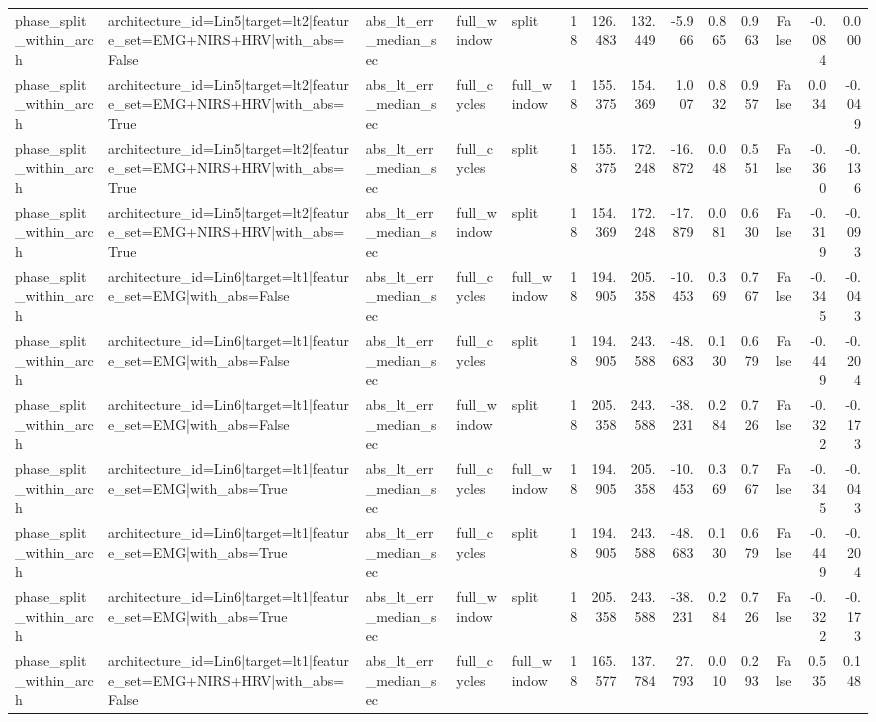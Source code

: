 \begin{table}
\begin{tabular}{lllllrrrrrrrrr}
phase_split_within_arch & architecture_id=Lin5|target=lt2|feature_set=EMG+NIRS+HRV|with_abs=False & abs_lt_err_median_sec & full_window & split & 18 & 126.483 & 132.449 & -5.966 & 0.865 & 0.963 & False & -0.084 & 0.000 \\
phase_split_within_arch & architecture_id=Lin5|target=lt2|feature_set=EMG+NIRS+HRV|with_abs=True & abs_lt_err_median_sec & full_cycles & full_window & 18 & 155.375 & 154.369 & 1.007 & 0.832 & 0.957 & False & 0.034 & -0.049 \\
phase_split_within_arch & architecture_id=Lin5|target=lt2|feature_set=EMG+NIRS+HRV|with_abs=True & abs_lt_err_median_sec & full_cycles & split & 18 & 155.375 & 172.248 & -16.872 & 0.048 & 0.551 & False & -0.360 & -0.136 \\
phase_split_within_arch & architecture_id=Lin5|target=lt2|feature_set=EMG+NIRS+HRV|with_abs=True & abs_lt_err_median_sec & full_window & split & 18 & 154.369 & 172.248 & -17.879 & 0.081 & 0.630 & False & -0.319 & -0.093 \\
phase_split_within_arch & architecture_id=Lin6|target=lt1|feature_set=EMG|with_abs=False & abs_lt_err_median_sec & full_cycles & full_window & 18 & 194.905 & 205.358 & -10.453 & 0.369 & 0.767 & False & -0.345 & -0.043 \\
phase_split_within_arch & architecture_id=Lin6|target=lt1|feature_set=EMG|with_abs=False & abs_lt_err_median_sec & full_cycles & split & 18 & 194.905 & 243.588 & -48.683 & 0.130 & 0.679 & False & -0.449 & -0.204 \\
phase_split_within_arch & architecture_id=Lin6|target=lt1|feature_set=EMG|with_abs=False & abs_lt_err_median_sec & full_window & split & 18 & 205.358 & 243.588 & -38.231 & 0.284 & 0.726 & False & -0.322 & -0.173 \\
phase_split_within_arch & architecture_id=Lin6|target=lt1|feature_set=EMG|with_abs=True & abs_lt_err_median_sec & full_cycles & full_window & 18 & 194.905 & 205.358 & -10.453 & 0.369 & 0.767 & False & -0.345 & -0.043 \\
phase_split_within_arch & architecture_id=Lin6|target=lt1|feature_set=EMG|with_abs=True & abs_lt_err_median_sec & full_cycles & split & 18 & 194.905 & 243.588 & -48.683 & 0.130 & 0.679 & False & -0.449 & -0.204 \\
phase_split_within_arch & architecture_id=Lin6|target=lt1|feature_set=EMG|with_abs=True & abs_lt_err_median_sec & full_window & split & 18 & 205.358 & 243.588 & -38.231 & 0.284 & 0.726 & False & -0.322 & -0.173 \\
phase_split_within_arch & architecture_id=Lin6|target=lt1|feature_set=EMG+NIRS+HRV|with_abs=False & abs_lt_err_median_sec & full_cycles & full_window & 18 & 165.577 & 137.784 & 27.793 & 0.010 & 0.293 & False & 0.535 & 0.148 \\

\end{tabular}
\end{table}
